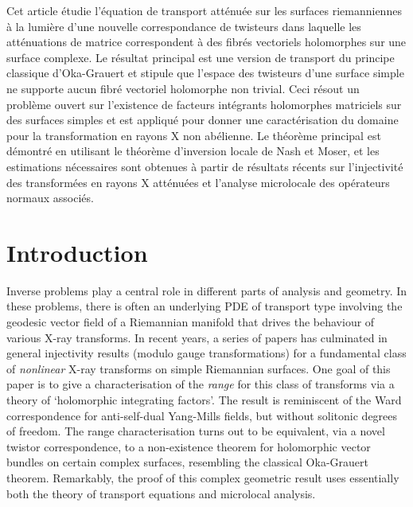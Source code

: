 \documentclass[JEP,XML,SOM,Unicode,published]{cedram}
\theoremstyle{plain}
\theoremstyle{definition}
\newcommand{\1}{{\bf 1}}
\begin{document}
\begin{altabstract}
Cet article étudie l'équation de transport atténuée sur les surfaces riemanniennes à la lumière d'une nouvelle correspondance de twisteurs dans laquelle les atténuations de matrice correspondent à des fibrés vectoriels holomorphes sur une surface complexe. Le résultat principal est une version de transport du principe classique d'Oka-Grauert et stipule que l'espace des twisteurs d'une surface simple ne supporte aucun fibré vectoriel holomorphe non trivial. Ceci résout un problème ouvert sur l'existence de facteurs intégrants holomorphes matriciels sur des surfaces simples et est appliqué pour donner une caractérisation du domaine pour la transformation en rayons X non abélienne. Le théorème principal est démontré en utilisant le théorème d'inversion locale de Nash et Moser, et les estimations nécessaires sont obtenues à partir de résultats récents sur l'injectivité des transformées en rayons X atténuées et l'analyse microlocale des opérateurs normaux associés.
\end{altabstract}

\maketitle
\vspace*{-\baselineskip}
\tableofcontents
\mainmatter

\section{Introduction}

Inverse problems play a central role in different parts of analysis and geometry. In these problems, there is often an underlying PDE of transport type involving the geodesic vector field of a Riemannian manifold that drives the behaviour of various X-ray transforms.
In recent years, a series of papers has culminated in general injectivity results (modulo gauge transformations) for
a fundamental class of \emph{nonlinear} X-ray transforms on simple Riemannian surfaces.
One goal of this paper is to give a characterisation of the \emph{range} for this class of transforms
via a theory of `holomorphic integrating factors’. The result is reminiscent of the Ward correspondence for anti-self-dual Yang-Mills fields, but without solitonic degrees of freedom. The range characterisation turns out to be equivalent, via a novel twistor correspondence, to a non-existence theorem for holomorphic vector bundles on certain complex surfaces, resembling the classical Oka-Grauert theorem. Remarkably, the proof of this complex geometric result uses essentially both the theory of transport equations and microlocal analysis.
\end{document}
